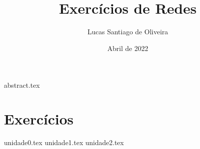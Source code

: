 \documentclass[twoside, 12pt]{article}
\title{Exercícios de Redes}
\author{Lucas Santiago de Oliveira}
\date{Abril de 2022}
\begin{document}
    \maketitle
    \tableofcontents
    {abstract.tex}

    \twocolumn %

    \section*{Exercícios}
    {unidade0.tex}
    {unidade1.tex}  
    {unidade2.tex}
    
    \printbibliography
    
\end{document}
